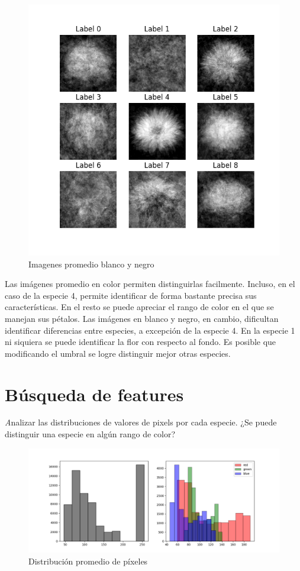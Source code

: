 \documentclass{article}
\begin{document}
\begin{figure}[h!]
  \centering    
  \includegraphics[width=.6\textwidth]{7_3_promedio_especies_bn.png}
  \caption{Imagenes promedio blanco y negro}
\end{figure}
\pagebreak
Las imágenes promedio en color permiten distinguirlas facilmente. Incluso,
en el caso de la especie 4, permite identificar de forma bastante precisa sus
características. En el resto se puede apreciar el rango de color en el que se
manejan sus pétalos. Las imágenes en blanco y negro, en cambio, dificultan identificar diferencias
entre especies, a excepción de la especie 4. En la especie 1 ni siquiera se
puede identificar la flor con respecto al fondo. Es posible que modificando el
umbral se logre distinguir mejor otras especies.

\section{Búsqueda de features}

{\emph Analizar las distribuciones de valores de pixels por cada especie. ¿Se puede distinguir
una especie en algún rango de color?}

\begin{figure}[h!]
  \centering    
  \includegraphics[width=.75\textwidth]{8_1_pixeles_general.png}
  \caption{Distribución promedio de píxeles}
\end{figure}
\end{document}

